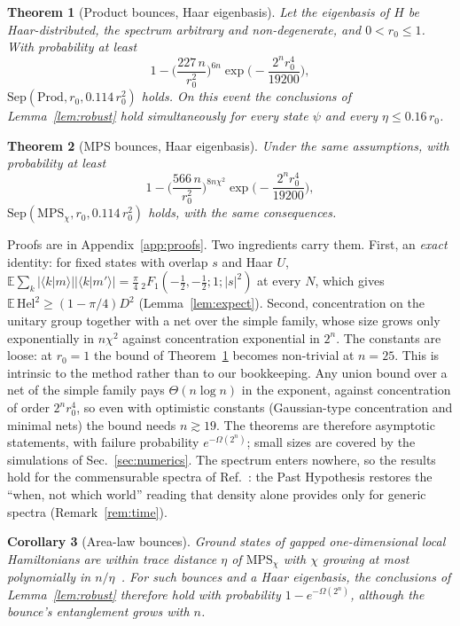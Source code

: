 \documentclass[11pt]{article}
\newtheorem{theorem}{Theorem}
\newtheorem{corollary}[theorem]{Corollary}
\theoremstyle{definition}
\theoremstyle{remark}
\newcommand{\braket}[2]{\langle #1|#2\rangle}
\newcommand{\Hel}{\mathrm{Hel}}
\newcommand{\Prod}{\mathrm{Prod}}
\newcommand{\MPS}{\mathrm{MPS}}
\newcommand{\E}{\mathbb{E}}
\begin{document}
\begin{theorem}[Product bounces, Haar eigenbasis]\label{thm:haar}
Let the eigenbasis of $H$ be Haar-distributed, the spectrum arbitrary and non-degenerate, and $0<r_0\le1$. With probability at least
\[
1-\Big(\frac{227\,n}{r_0^2}\Big)^{6n}\exp\!\Big(-\frac{2^n r_0^4}{19200}\Big),
\]
$\mathrm{Sep}(\Prod,r_0,0.114\,r_0^2)$ holds. On this event the conclusions of Lemma~\ref{lem:robust} hold simultaneously for every state $\psi$ and every $\eta\le0.16\,r_0$.
\end{theorem}

\begin{theorem}[MPS bounces, Haar eigenbasis]\label{thm:mps}
Under the same assumptions, with probability at least
\[
1-\Big(\frac{566\,n}{r_0^2}\Big)^{8n\chi^2}\exp\!\Big(-\frac{2^n r_0^4}{19200}\Big),
\]
$\mathrm{Sep}(\MPS_\chi,r_0,0.114\,r_0^2)$ holds, with the same consequences.
\end{theorem}

Proofs are in Appendix~\ref{app:proofs}. Two ingredients carry them. First, an \emph{exact} identity: for fixed states with overlap $s$ and Haar $U$, $\E\sum_k|\braket{k}{m}||\braket{k}{m'}|=\frac\pi4\,{}_2F_1(-\tfrac12,-\tfrac12;1;|s|^2)$ at every $N$, which gives $\E\,\Hel^2\ge(1-\pi/4)D^2$ (Lemma~\ref{lem:expect}). Second, concentration on the unitary group together with a net over the simple family, whose size grows only exponentially in $n\chi^2$ against concentration exponential in $2^n$. The constants are loose: at $r_0=1$ the bound of Theorem~\ref{thm:haar} becomes non-trivial at $n=25$. This is intrinsic to the method rather than to our bookkeeping. Any union bound over a net of the simple family pays $\Theta(n\log n)$ in the exponent, against concentration of order $2^n r_0^4$, so even with optimistic constants (Gaussian-type concentration and minimal nets) the bound needs $n\gtrsim19$. The theorems are therefore asymptotic statements, with failure probability $e^{-\Omega(2^n)}$; small sizes are covered by the simulations of Sec.~\ref{sec:numerics}. The spectrum enters nowhere, so the results hold for the commensurable spectra of Ref.~\cite{CDD2026}: the Past Hypothesis restores the ``when, not which world'' reading that density alone provides only for generic spectra (Remark~\ref{rem:time}).

\begin{corollary}[Area-law bounces]\label{cor:area}
Ground states of gapped one-dimensional local Hamiltonians are within trace distance $\eta$ of $\MPS_\chi$ with $\chi$ growing at most polynomially in $n/\eta$~\cite{Hastings2007,AKLV2013}. For such bounces and a Haar eigenbasis, the conclusions of Lemma~\ref{lem:robust} therefore hold with probability $1-e^{-\Omega(2^n)}$, although the bounce's entanglement grows with $n$.
\end{corollary}
\end{document}
